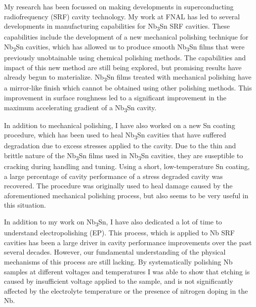 \documentclass[]{revtex4-2}
\begin{document}
    My research has been focussed on making developments in superconducting radiofrequency (SRF) cavity technology. My work at FNAL has led to several developments in manufacturing capabilities for Nb\textsubscript{3}Sn SRF cavities. These capabilities include the development of a new mechanical polishing technique for Nb\textsubscript{3}Sn cavities, which has allowed us to produce smooth Nb\textsubscript{3}Sn films that were previously unobtainable using chemical polishing methods.\cite{viklund2023improving} The capabilities and impact of this new method are still being explored, but promising results have already begun to materialize. Nb\textsubscript{3}Sn films treated with mechanical polishing have a mirror-like finish which cannot be obtained using other polishing methods. This improvement in surface roughness led to a significant improvement in the maximum accelerating gradient of a Nb\textsubscript{3}Sn cavity.
    
    In addition to mechanical polishing, I have also worked on a new Sn coating procedure, which has been used to heal Nb\textsubscript{3}Sn cavities that have suffered degradation due to excess stresses applied to the cavity. Due to the thin and brittle nature of the Nb\textsubscript{3}Sn films used in Nb\textsubscript{3}Sn cavities, they are suseptible to cracking during handling and tuning. Using a short, low-temperature Sn coating, a large percentage of cavity performance of a stress degraded cavity was recovered. The procedure was originally used to heal damage caused by the aforementioned mechanical polishing process, but also seems to be very useful in this situation.

    In addition to my work on Nb\textsubscript{3}Sn, I have also dedicated a lot of time to understand electropolishing (EP). This process, which is applied to Nb SRF cavities has been a large driver in cavity performance improvements over the past several decades. However, our fundamental understanding of the physical mechanisms of this process are still lacking. By systematically polishing Nb samples at different voltages and temperatures I was able to show that etching is caused by insufficient voltage applied to the sample, and is not significantly affected by the electrolyte temperature or the presence of nitrogen doping in the Nb.\cite{viklund:srf2021-supcav016}
\end{document}
